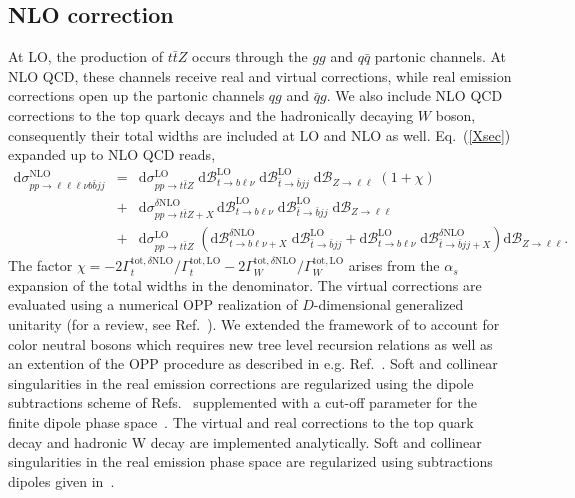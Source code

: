 \documentclass[preprint]{JHEP3} %
\newcommand{\mrm}{\mathrm}
\newcommand{\rd}{\mathrm{d}}
\newcommand{\Br}{\mathcal{B}}
\def\ttbZ{t\bar{t}Z}
\newcommand{\be}{\begin{eqnarray}}
\newcommand{\ee}{\end{eqnarray}}
\begin{document}
\subsection{NLO correction}
At LO, the production of $\ttbZ$ occurs through the $gg$ and $q\bar{q}$ partonic channels. 
At NLO QCD, these channels receive real and virtual corrections, while real emission corrections open up the partonic channels $qg$ and $\bar{q}g$. 
We also include NLO QCD corrections to the top quark decays and the hadronically decaying $W$ boson, consequently their total widths are included at LO and NLO as well.
Eq.~(\ref{Xsec}) expanded up to NLO QCD reads,
\be
 \rd \sigma_{pp\to\ell\ell\ell\nu b \bar{b} jj}^\mrm{NLO} &=& 
 \rd \sigma_{pp\to\ttbZ}^\mrm{LO} \; \rd\Br_{t\to b \ell\nu}^\mrm{LO} \; \rd\Br_{\bar{t} \to \bar{b} jj}^\mrm{LO} \; \rd\Br_{Z\to \ell\ell}
 \; \left( 1 + \chi \right)
\nonumber \\
 &+&   \rd \sigma_{pp\to\ttbZ+X}^{\delta \mrm{NLO}}  \, \rd\Br_{t\to b \ell\nu}^\mrm{LO} \; \rd\Br_{\bar{t} \to \bar{b} jj}^\mrm{LO} \; \rd\Br_{Z\to \ell\ell}
\nonumber \\
 &+&  \rd \sigma_{pp\to\ttbZ}^\mrm{LO} \; \left(  \rd\Br_{t\to b \ell\nu+X}^{\delta\mrm{NLO}} \; \rd\Br_{\bar{t} \to \bar{b} jj}^\mrm{LO} + \rd\Br_{t\to b \ell\nu}^\mrm{LO} \; \rd\Br_{\bar{t} \to \bar{b} jj+X}^{\delta\mrm{NLO}} \right) \rd\Br_{Z\to \ell\ell}
. \label{XsecNLO}
\ee
The factor $\chi= -2 \Gamma_t^{\mrm{tot},\delta\mrm{NLO}}/\Gamma_t^{\mrm{tot,LO}} -2 \Gamma_W^{\mrm{tot},\delta\mrm{NLO}}/\Gamma_W^{\mrm{tot,LO}} $ arises from the $\alpha_s$ expansion
of the total widths in the denominator.
The virtual corrections are evaluated using a numerical OPP realization \cite{Ossola:2006} of $D$-dimensional generalized unitarity \cite{Ellis:2007br,Giele:2008ve,Ellis:2008ir} (for a review, see Ref.~\cite{Ellis:2011}).
We extended the framework of \cite{Melnikov:2009dn} to account for color neutral bosons which requires new tree level recursion relations as well as an extention of the OPP procedure as described in e.g. Ref.~\cite{}.
Soft and collinear singularities in the real emission corrections are regularized using the dipole subtractions scheme of Refs.~\cite{Catani:1996vz,Catani:2002hc} supplemented with a cut-off parameter for the
finite dipole phase space~\cite{Nagy:2003tz,Nagy:2003tz,copy from ttbphoton paper}.
The virtual and real corrections to the top quark decay and hadronic W decay are implemented analytically. Soft and collinear singularities in the real emission phase space are regularized using subtractions dipoles given in~\cite{see ttbphoton paper}.
\end{document}
